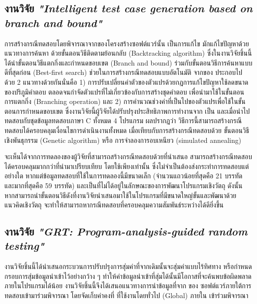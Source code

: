 \subsection{งานวิจัย {\it "Intelligent test case generation based on branch and bound"} \cite{XING201491}}
การสร้างกรณีทดสอบโดยพิจารณาจาก{\Path}ของโครงสร้างซอฟต์แวร์นั้น เป็นการแก้ไข\FirstTimeDefine{\csp}{\cspEN} มักแก้ไขปัญหาด้วยแนวทางการค้นหา
ด้วยขั้นตอนวิธีติดตามย้อนกลับ (Backtracking algorithm) ซึ่งในงานวิจัยชิ้นนี้ได้นำขั้นตอนวิธีแตกกิ่งและกำหนดขอบเขต (Branch and bound) 
ร่วมกับขั้นตอนวิธีการค้นหาแบบดีที่สุดก่อน (Best-first search) ช่วยในการสร้างกรณีทดสอบแบบอัตโนมัติ จาก{\StaticInformation}ของ{\sourcecode} 
ประกอบไปด้วย 2 แนวทางด้วยกันนั่นคือ 
1) การปรับเปลี่ยนค่าตัวของตัวแปรด้วยกฎการแก้ไขปัญหาใช้ลดขนาดของปริภูมิคำตอบ ตลอดจนกำจัดตัวแปรที่ไม่เกี่ยวข้องกับการสร้างชุดคำตอบ 
เพื่อนำมาใช้ในขั้นตอนการแตกกิ่ง (Branching operation) และ 2) การคำนวณช่วงค่าที่เป็นไปของตัวแปรเพื่อใช้ในขั้นตอนการกำหนดขอบเขต
ซึ่งงานวิจัยนี้ผู้วิจัยได้ปรับปรุงประสิทธิภาพการทำงานจาก  เป็น  และเมื่อนำไปทดสอบกับชุดข้อมูลทดสอบภาษา C ทั้งหมด 4 โปรแกรม
ผลปรากฎว่า วิธีการนี้สามารถสร้างกรณีทดสอบได้ครอบคลุมเงื่อนไขการดำเนินงานทั้งหมด เมื่อเทียบกับการสร้างกรณีทดสอบด้วย ขั้นตอนวิธีเชิงพันธุกรรม (Genetic algorithm)
หรือ การจำลองการอบเหนียว (simulated annealing) 

จะเห็นได้จากการทดลองของผู้วิจัยที่สามารถสร้างกรณีทดสอบด้วย{\Algorithm}ที่นำเสนอ สามารถสร้างกรณีทดสอบได้ครอบคลุมมากกว่า{\Algorithm}ที่นำมาเปรียบเทียบ 
โดยใช้เพียง{\StaticInformation}เท่านั้น ซึ่งไม่จำเป็นต้องส่งกระทำการทดสอบ{\sourcecode}แต่อย่างใด หากแต่ข้อมูลทดสอบที่ใช้ในการทดลองนี้มีขนาดเล็ก 
(จำนวนแถวน้อยที่สุดคือ 21 บรรทัด และมากที่สุดคือ 59 บรรทัด) และเป็น{\sourcecode}ที่ไม่ได้อยู่ในลักษณะของการพัฒนาโปรแกรมเชิงวัตถุ 
ดังนั้นหากสามารถนำขั้นตอนวิธีดังที่งานวิจัยนำเสนอมาใช้ในโปรแกรมที่มีขนาดใหญ่ขั้นและพัฒนาด้วยแนวคิดเชิงวัตถุ 
จะทำให้สามารถหากรณีทดสอบที่ครอบคลุมความสัมพันธ์ระหว่าง{\softwareComponent}ได้ดียิ่งขึ้น

\subsection{งานวิจัย {\it "GRT: Program-analysis-guided random testing"} \cite{Ma2016}}

งานวิจัยชิ้นนี้ได้นำเสนอกระบวนการปรับปรุงการสุ่มค่าที่จากเดิมนั้นจะสุ่มค่าแบบไร้ทิศทาง หรือกำหนดกรอบการสุ่มข้อมูลนำเข้าไว้อย่างกว้าง ๆ 
ทำให้ค่าข้อมูลนำเข้าที่สุ่มได้นั้นมีโอกาสที่จะค้นพบข้อผิดพลาดภายในโปรแกรมได้น้อย งานวิจัยชิ้นนี้จึงได้เสนอแนวทางการนำข้อมูลที่จาก{\sourcecode} ของ
ซอฟต์แวร์ภายใต้การทดสอบเข้ามาร่วมพิจารณา โดยจัดเก็บค่าคงที่ ที่ใช้งานโดยทั่วไป (Global) ภายใน{\sourcecode} เข้าร่วมพิจารณา 

